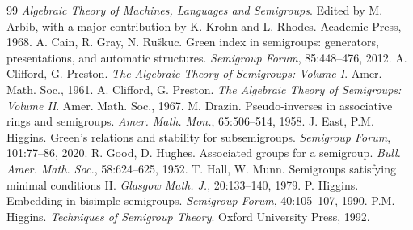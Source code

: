 \documentclass[twoside,a4paper,12pt,reqno]{amsart}
\theoremstyle{plain}
\theoremstyle{definition}
\begin{document}
\vspace{0.5em}
\begin{thebibliography}{99}
\textit{Algebraic Theory of Machines, Languages and Semigroups}.  Edited by M.\! Arbib, with a major contribution by K.\! Krohn and L.\! Rhodes.  Academic Press, 1968.
A.\! Cain, R.\! Gray, N.\! Ru{\v s}kuc.  Green index in semigroups: generators, presentations, and automatic structures.  \textit{Semigroup Forum}, 85:448--476, 2012.
A.\! Clifford, G.\! Preston.  {\em The Algebraic Theory of Semigroups: Volume I}.   Amer. Math. Soc., 1961.
A.\! Clifford, G.\! Preston.  {\em The Algebraic Theory of Semigroups: Volume II}.   Amer. Math. Soc., 1967.
M.\! Drazin.  Pseudo-inverses in associative rings and semigroups.  \textit{Amer. Math. Mon.}, 65:506--514, 1958.
J.\! East, P.M.\! Higgins.  Green's relations and stability for subsemigroups.  \textit{Semigroup Forum}, 101:77--86, 2020.
R.\! Good, D.\! Hughes.  Associated groups for a semigroup.  \textit{Bull. Amer. Math. Soc.}, 58:624--625, 1952.
T.\! Hall, W.\! Munn.  Semigroups satisfying minimal conditions II.  \textit{Glasgow Math. J.}, 20:133--140, 1979.
P. Higgins.  Embedding in bisimple semigroups.  \textit{Semigroup Forum}, 40:105--107, 1990.
P.M.\! Higgins.  \textit{Techniques of Semigroup Theory}.  Oxford University Press, 1992.

\end{thebibliography}
\end{document}
